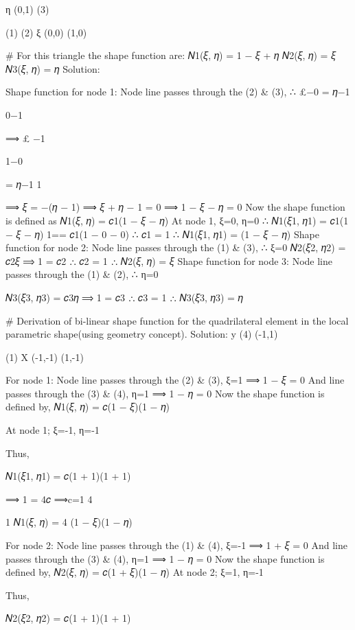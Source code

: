 {{{{{{η (0,1) (3)



(1)	(2)	ξ
(0,0)	(1,0)


# For this triangle the shape function are:
𝑁1(𝜉, 𝜂) = 1 − 𝜉 + 𝜂
𝑁2(𝜉, 𝜂) = 𝜉
𝑁3(𝜉, 𝜂) = 𝜂
Solution:
 
Shape function for node 1:
Node line passes through the (2) & (3),
∴ £−0 = 𝜂−1
 
0−1

⟹ £
−1
 
1−0

= 𝜂−1
1
 
⟹ 𝜉 = −(𝜂 − 1)
⟹ 𝜉 + 𝜂 − 1 = 0
⟹ 1 − 𝜉 − 𝜂 = 0
Now the shape function is defined as
𝑁1(𝜉, 𝜂) = 𝑐1(1 − 𝜉 − 𝜂)
At node 1, ξ=0, η=0
∴ 𝑁1(𝜉1, 𝜂1) = 𝑐1(1 − 𝜉 − 𝜂)
1== 𝑐1(1 − 0 − 0)
∴ 𝑐1 = 1
∴ 𝑁1(𝜉1, 𝜂1) = (1 − 𝜉 − 𝜂)
Shape function for node 2:
Node line passes through the (1) & (3),
∴ ξ=0
𝑁2(𝜉2, 𝜂2) = 𝑐2𝜉
⟹ 1 = 𝑐2
∴ 𝑐2 = 1
∴ 𝑁2(𝜉, 𝜂) = 𝜉
Shape function for node 3:
Node line passes through the (1) & (2),
∴ η=0
 
𝑁3(𝜉3, 𝜂3) = 𝑐3𝜂
⟹ 1 = 𝑐3
∴ 𝑐3 = 1
∴ 𝑁3(𝜉3, 𝜂3) = 𝜂




# Derivation of bi-linear shape function for the quadrilateral element in the local parametric shape(using geometry concept).
Solution:
y	(4)
(-1,1)




(1)
X	(-1,-1)	(1,-1)


For node 1:
Node line passes through the (2) & (3), ξ=1
⟹ 1 − 𝜉 = 0
And line passes through the (3) & (4), η=1
⟹ 1 − 𝜂 = 0
Now the shape function is defined by,
𝑁1(𝜉, 𝜂) = 𝑐(1 − 𝜉)(1 − 𝜂)
 
At node 1; ξ=-1, η=-1

 
Thus,
 

𝑁1(𝜉1, 𝜂1) = 𝑐(1 + 1)(1 + 1)
 

 
⟹ 1 = 4𝑐
⟹c=1
4
 




1
𝑁1(𝜉, 𝜂) = 4 (1 − 𝜉)(1 − 𝜂)
 


For node 2:
Node line passes through the (1) & (4), ξ=-1
⟹ 1 + 𝜉 = 0
And line passes through the (3) & (4), η=1
⟹ 1 − 𝜂 = 0
Now the shape function is defined by,
𝑁2(𝜉, 𝜂) = 𝑐(1 + 𝜉)(1 − 𝜂)
At node 2; ξ=1, η=-1

 
Thus,
 

𝑁2(𝜉2, 𝜂2) = 𝑐(1 + 1)(1 + 1)
 

}}}}}}
